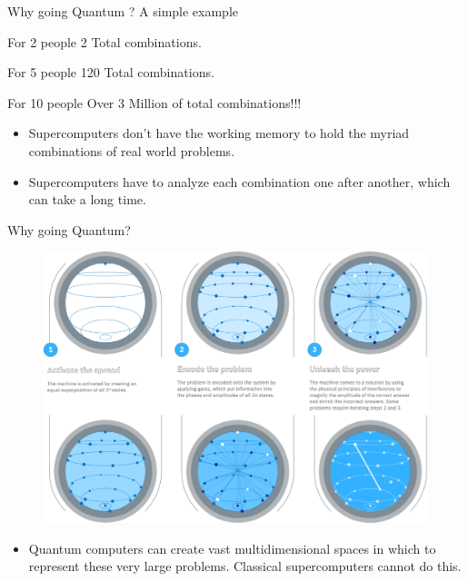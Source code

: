 \begin{frame}[<+- | only+>]{Why going Quantum ? A simple example}
	
	
	\begin{exampleblock}{For 2 people}
		2 Total combinations.
	\end{exampleblock}

	\begin{block}{For 5 people}
		120 Total combinations.
	\end{block}
	

	\begin{alertblock}{For 10 people}
		Over 3 Million of total combinations!!!
	\end{alertblock}	
	
	\begin{itemize}
		\item Supercomputers don't have the working \alert{memory} to hold the myriad combinations of real world problems.
		\item Supercomputers have to analyze each combination one after another, which can take a long \alert{time}.
	\end{itemize}
\end{frame}

\begin{frame}{Why going Quantum?}
\begin{figure}[H]
    \centering
    \includegraphics[width=.7\linewidth]{ quantumsup.png}
\end{figure}
\begin{itemize}
    \item Quantum computers can create vast multidimensional spaces in which to represent these very large problems. Classical supercomputers cannot do this.
   
\end{itemize}
  
\end{frame}


